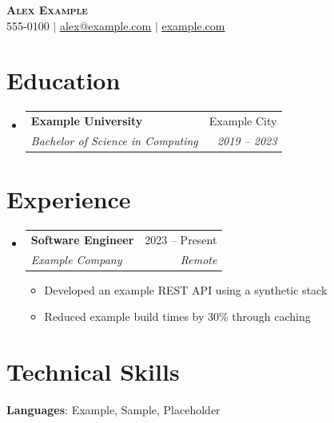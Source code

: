 \documentclass[letterpaper,11pt]{article}
\makeatletter
\newcommand{\resumeItem}[1]{\item\small{{#1 \vspace{-2pt}}}}
\newcommand{\resumeSubheading}[4]{
  \vspace{-2pt}\item
    \begin{tabular*}{0.97\textwidth}[t]{l@{\extracolsep{\fill}}r}
      \textbf{#1} & #2 \\
      \textit{\small#3} & \textit{\small #4} \\
    \end{tabular*}\vspace{-7pt}
}
\newcommand{\resumeSubHeadingListStart}{\begin{itemize}[leftmargin=0.15in, label={}]}
\newcommand{\resumeSubHeadingListEnd}{\end{itemize}}
\newcommand{\resumeItemListStart}{\begin{itemize}}
\newcommand{\resumeItemListEnd}{\end{itemize}\vspace{-5pt}}
\makeatother
\begin{document}
\begin{center}
  \textbf{\Huge \scshape Alex Example} \\ \vspace{1pt}
  \small 555-0100 $|$ \href{mailto:alex@example.com}{\underline{alex@example.com}} $|$
  \href{https://example.com}{\underline{example.com}}
\end{center}
\section{Education}
  \resumeSubHeadingListStart
    \resumeSubheading{Example University}{Example City}{Bachelor of Science in Computing}{2019 -- 2023}
  \resumeSubHeadingListEnd
\section{Experience}
  \resumeSubHeadingListStart
    \resumeSubheading{Software Engineer}{2023 -- Present}{Example Company}{Remote}
      \resumeItemListStart
        \resumeItem{Developed an example REST API using a synthetic stack}
        \resumeItem{Reduced example build times by 30\% through caching}
      \resumeItemListEnd
  \resumeSubHeadingListEnd
\section{Technical Skills}
 \begin{itemize}[leftmargin=0.15in, label={}]
    \small{\item{\textbf{Languages}{: Example, Sample, Placeholder}}}
 \end{itemize}
\end{document}
